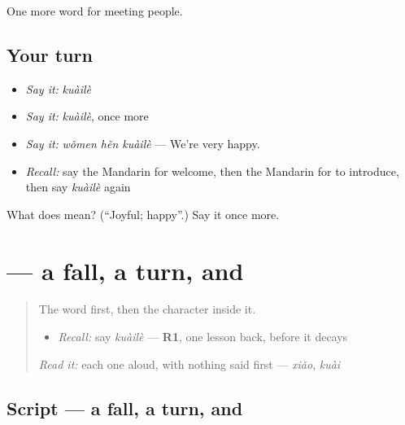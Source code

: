\begin{grammarlens}[title={What you've built}]
One more word for meeting people.
\end{grammarlens}

\subsection*{Your turn}
\begin{itemize}
\raggedright
  \item \emph{Say it:} \emph{kuàilè}
  \item \emph{Say it:} \emph{kuàilè}, once more
  \item \emph{Say it:} \emph{wǒmen hěn kuàilè} — We're very happy.
  \item \emph{Recall:} say the Mandarin for welcome, then the Mandarin for to introduce, then say \emph{kuàilè} again
\end{itemize}

\begin{tcolorbox}[breakable,colback=teal!4,colframe=teal!35!black,title={Before you move on}]
What does  mean? (\textquotedblleft{}Joyful; happy\textquotedblright{}.) Say it once more.
\end{tcolorbox}
\section[\texorpdfstring{\zh{乐} (lè)}{乐 (lè)}]{ — a fall, a turn, and }

\label{lesson:ZH-W75-le-joy}



\begin{quote}
The word first, then the character inside it.

\begin{itemize}
\raggedright
  \item \emph{Recall:} say \emph{kuàilè} — \textbf{R1}, one lesson back, before it decays
\end{itemize}

\begin{quote}
 
\end{quote}

\emph{Read it:} each one aloud, with nothing said first — \emph{xiǎo}, \emph{kuài}
\end{quote}

\subsection*{Script — a fall, a turn, and }

